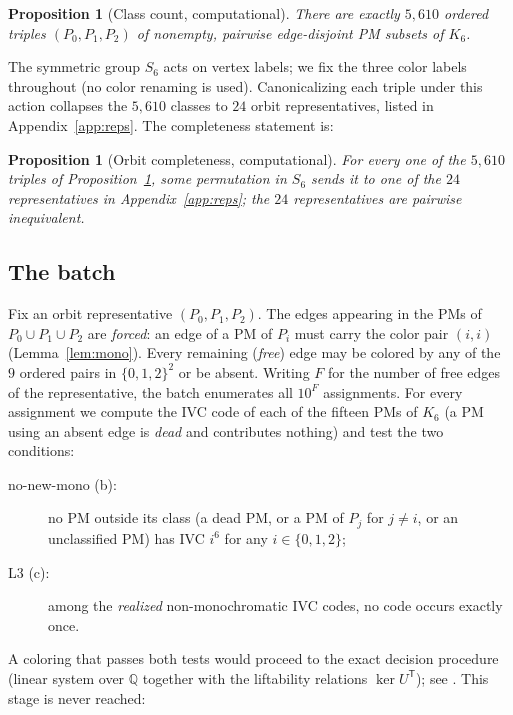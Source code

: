\documentclass[11pt]{article}
\newtheorem{proposition}[theorem]{Proposition}
\theoremstyle{definition}
\begin{document}
\begin{proposition}[Class count, computational]\label{prop:5610}
There are exactly $5{,}610$ ordered triples $(P_0,P_1,P_2)$ of
nonempty, pairwise edge-disjoint PM subsets of $K_6$.
\end{proposition}

The symmetric group $S_6$ acts on vertex labels; we fix the three color
labels throughout (no color renaming is used). Canonicalizing each
triple under this action collapses the $5{,}610$ classes to $24$
orbit representatives, listed in Appendix~\ref{app:reps}. The
completeness statement is:

\begin{proposition}[Orbit completeness, computational]\label{prop:24}
For every one of the $5{,}610$ triples of
Proposition~\ref{prop:5610}, some permutation in $S_6$ sends it to one
of the $24$ representatives in Appendix~\ref{app:reps}; the $24$
representatives are pairwise inequivalent.
\end{proposition}

\subsection{The batch}

Fix an orbit representative $(P_0,P_1,P_2)$. The edges appearing in the
PMs of $P_0\cup P_1\cup P_2$ are \emph{forced}: an edge of a PM of
$P_i$ must carry the color pair $(i,i)$ (Lemma~\ref{lem:mono}). Every
remaining (\emph{free}) edge may be colored by any of the $9$ ordered
pairs in $\{0,1,2\}^2$ or be absent. Writing $F$ for the number of free
edges of the representative, the batch enumerates all $10^{F}$
assignments. For every assignment we compute the IVC code of each of
the fifteen PMs of $K_6$ (a PM using an absent edge is \emph{dead} and
contributes nothing) and test the two conditions:

\begin{description}
\item[no-new-mono (b):] no PM outside its class (a dead PM, or a PM of
$P_j$ for $j\neq i$, or an unclassified PM) has IVC $i^6$ for any
$i\in\{0,1,2\}$;
\item[L3 (c):] among the \emph{realized} non-monochromatic IVC codes,
no code occurs exactly once.
\end{description}

A coloring that passes both tests would proceed to the exact decision
procedure (linear system over $\mathbb Q$ together with the
liftability relations $\ker U^{\mathsf T}$); see \cite{notes}. This
stage is never reached:
\end{document}
